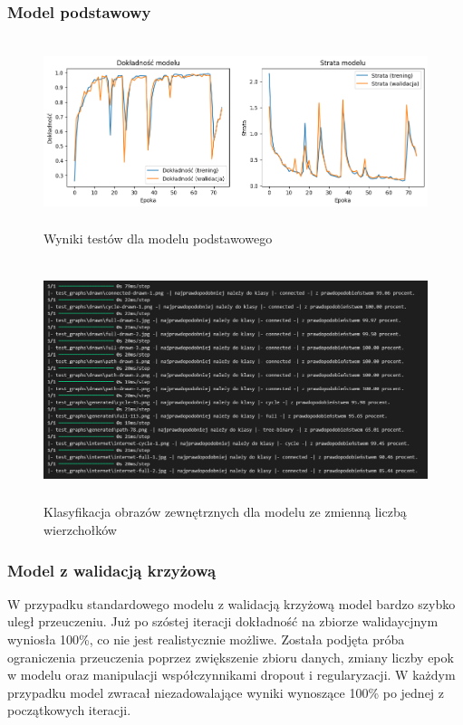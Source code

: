 \subsubsection{Model podstawowy}

\begin{figure}[ht]
	\centering
	\includegraphics[height=5.5cm]{resources/tests/images/v2_epoch75.png}
	\caption{Wyniki testów dla modelu podstawowego}
	\label{Fig:tests-base-1}
\end{figure}
\FloatBarrier

\begin{figure}[ht]
	\centering
	\includegraphics[height=7cm]{resources/tests/images/v2_epoch75_img_tests.png}
	\caption{Klasyfikacja obrazów zewnętrznych dla modelu ze zmienną liczbą wierzchołków}
	\label{Fig:tests-base-2}
\end{figure}
\FloatBarrier

\subsubsection{Model z walidacją krzyżową}

W przypadku standardowego modelu z walidacją krzyżową model bardzo szybko uległ przeuczeniu.
Już po szóstej iteracji dokładność na zbiorze walidaycjnym wyniosła 100\%, co nie jest realistycznie możliwe.
Została podjęta próba ograniczenia przeuczenia poprzez zwiększenie zbioru danych, zmiany liczby epok w modelu
oraz manipulacji współczynnikami dropout i regularyzacji.
W każdym przypadku model zwracał niezadowalające wyniki wynoszące 100\% po jednej z początkowych iteracji.

